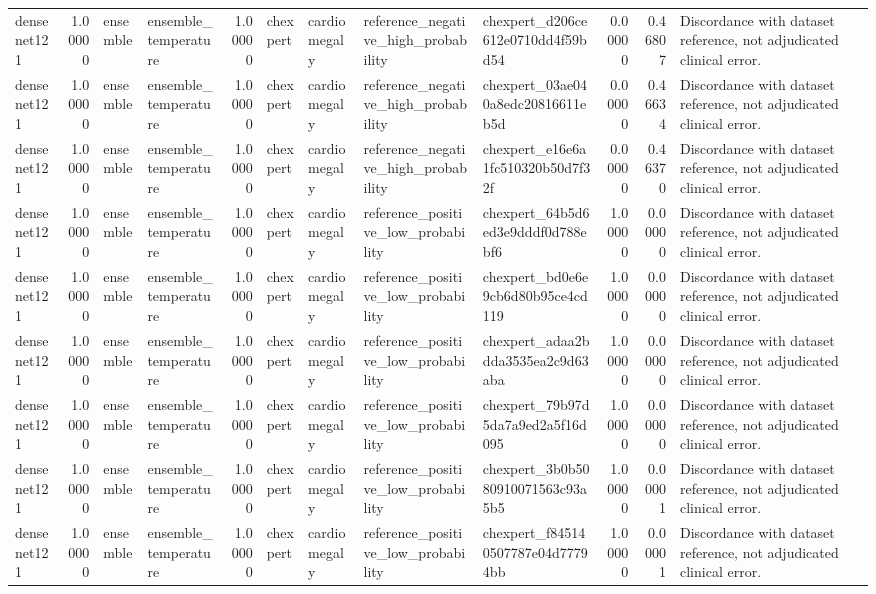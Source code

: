 \begin{tabular}{lrllrllllrrl}
densenet121 & 1.00000 & ensemble & ensemble\_temperature & 1.00000 & chexpert & cardiomegaly & reference\_negative\_high\_probability & chexpert\_d206ce612e0710dd4f59bd54 & 0.00000 & 0.46807 & Discordance with dataset reference, not adjudicated clinical error. \\
densenet121 & 1.00000 & ensemble & ensemble\_temperature & 1.00000 & chexpert & cardiomegaly & reference\_negative\_high\_probability & chexpert\_03ae040a8edc20816611eb5d & 0.00000 & 0.46634 & Discordance with dataset reference, not adjudicated clinical error. \\
densenet121 & 1.00000 & ensemble & ensemble\_temperature & 1.00000 & chexpert & cardiomegaly & reference\_negative\_high\_probability & chexpert\_e16e6a1fc510320b50d7f32f & 0.00000 & 0.46370 & Discordance with dataset reference, not adjudicated clinical error. \\
densenet121 & 1.00000 & ensemble & ensemble\_temperature & 1.00000 & chexpert & cardiomegaly & reference\_positive\_low\_probability & chexpert\_64b5d6ed3e9dddf0d788ebf6 & 1.00000 & 0.00000 & Discordance with dataset reference, not adjudicated clinical error. \\
densenet121 & 1.00000 & ensemble & ensemble\_temperature & 1.00000 & chexpert & cardiomegaly & reference\_positive\_low\_probability & chexpert\_bd0e6e9cb6d80b95ce4cd119 & 1.00000 & 0.00000 & Discordance with dataset reference, not adjudicated clinical error. \\
densenet121 & 1.00000 & ensemble & ensemble\_temperature & 1.00000 & chexpert & cardiomegaly & reference\_positive\_low\_probability & chexpert\_adaa2bdda3535ea2c9d63aba & 1.00000 & 0.00000 & Discordance with dataset reference, not adjudicated clinical error. \\
densenet121 & 1.00000 & ensemble & ensemble\_temperature & 1.00000 & chexpert & cardiomegaly & reference\_positive\_low\_probability & chexpert\_79b97d5da7a9ed2a5f16d095 & 1.00000 & 0.00000 & Discordance with dataset reference, not adjudicated clinical error. \\
densenet121 & 1.00000 & ensemble & ensemble\_temperature & 1.00000 & chexpert & cardiomegaly & reference\_positive\_low\_probability & chexpert\_3b0b5080910071563c93a5b5 & 1.00000 & 0.00001 & Discordance with dataset reference, not adjudicated clinical error. \\
densenet121 & 1.00000 & ensemble & ensemble\_temperature & 1.00000 & chexpert & cardiomegaly & reference\_positive\_low\_probability & chexpert\_f845140507787e04d77794bb & 1.00000 & 0.00001 & Discordance with dataset reference, not adjudicated clinical error. \\

\end{tabular}
